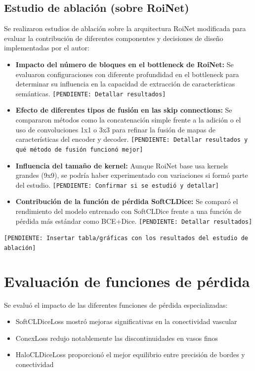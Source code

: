 \documentclass[11pt,a4paper]{report} %
\begin{document}
\subsection{Estudio de ablación (sobre RoiNet)}
Se realizaron estudios de ablación sobre la arquitectura RoiNet modificada para evaluar la contribución de diferentes componentes y decisiones de diseño implementadas por el autor:
\begin{itemize}
    \item \textbf{Impacto del número de bloques en el bottleneck de RoiNet:} Se evaluaron configuraciones con diferente profundidad en el bottleneck para determinar su influencia en la capacidad de extracción de características semánticas. \texttt{[PENDIENTE: Detallar resultados]}
    \item \textbf{Efecto de diferentes tipos de fusión en las skip connections:} Se compararon métodos como la concatenación simple frente a la adición o el uso de convoluciones 1x1 o 3x3 para refinar la fusión de mapas de características del encoder y decoder. \texttt{[PENDIENTE: Detallar resultados y qué método de fusión funcionó mejor]}
    \item \textbf{Influencia del tamaño de kernel:} Aunque RoiNet base usa kernels grandes (9x9), se podría haber experimentado con variaciones si formó parte del estudio. \texttt{[PENDIENTE: Confirmar si se estudió y detallar]}
    \item \textbf{Contribución de la función de pérdida SoftCLDice:} Se comparó el rendimiento del modelo entrenado con SoftCLDice frente a una función de pérdida más estándar como BCE+Dice. \texttt{[PENDIENTE: Detallar resultados]}
\end{itemize}
\texttt{[PENDIENTE: Insertar tabla/gráficas con los resultados del estudio de ablación]}

\section{Evaluación de funciones de pérdida}
Se evaluó el impacto de las diferentes funciones de pérdida especializadas:
\begin{itemize}
  \item SoftCLDiceLoss mostró mejoras significativas en la conectividad vascular
  \item ConexLoss redujo notablemente las discontinuidades en vasos finos
  \item HaloCLDiceLoss proporcionó el mejor equilibrio entre precisión de bordes y conectividad
\end{itemize}
\end{document}
